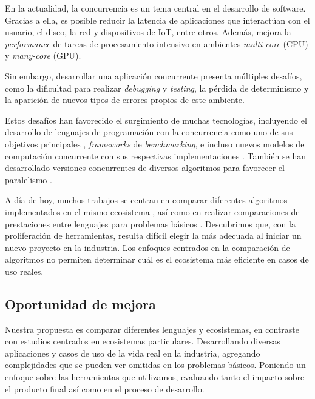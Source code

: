 \documentclass[11pt]{article}
\let\Oldsubsection\subsection
\renewcommand{\subsection}{\FloatBarrier\Oldsubsection}
\newcommand{\english}[1]{\textit{#1}}
\begin{document}
En la actualidad, la concurrencia es un tema central en el desarrollo de software. Gracias a ella, es posible reducir la latencia de aplicaciones que interactúan con el usuario, el disco, la red y dispositivos de IoT, entre otros. Además, mejora la \english{performance} de tareas de procesamiento intensivo en ambientes \english{multi-core} (CPU) y \english{many-core} (GPU).

Sin embargo, desarrollar una aplicación concurrente presenta múltiples desafíos, como la dificultad para realizar \textit{debugging} y \textit{testing}, la pérdida de determinismo y la aparición de nuevos tipos de errores propios de este ambiente.

Estos desafíos han favorecido el surgimiento de muchas tecnologías, incluyendo el desarrollo de lenguajes de programación con la concurrencia como uno de sus objetivos principales \cite{rust:ex:fearless_concurrency} \cite{go:ex:concurrency_patterns}, \textit{frameworks} de \textit{benchmarking}, e incluso nuevos modelos de computación concurrente con sus respectivas implementaciones \cite{state_of_the_art:reactors}. También se han desarrollado versiones concurrentes de diversos algoritmos para favorecer el paralelismo \cite{state_of_the_art:huffman_gpu}.

A día de hoy, muchos trabajos se centran en comparar diferentes algoritmos implementados en el mismo ecosistema \cite{state_of_the_art:crypto_benchmarks} \cite{state_of_the_art:nn_benchmarks}, así como en realizar comparaciones de prestaciones entre lenguajes para problemas básicos \cite{state_of_the_art:lang_benchmarks}. Descubrimos que, con la proliferación de herramientas, resulta difícil elegir la más adecuada al iniciar un nuevo proyecto en la industria. Los enfoques centrados en la comparación de algoritmos no permiten determinar cuál es el ecosistema más eficiente en casos de uso reales.

\subsection{Oportunidad de mejora}

Nuestra propuesta es comparar diferentes lenguajes y ecosistemas, en contraste con estudios centrados en ecosistemas particulares.
Desarrollando diversas aplicaciones y casos de uso de la vida real en la industria, agregando complejidades que se pueden ver omitidas en los problemas básicos.
Poniendo un enfoque sobre las herramientas que utilizamos, evaluando tanto el impacto sobre el producto final así como en el proceso de desarrollo.
\end{document}
